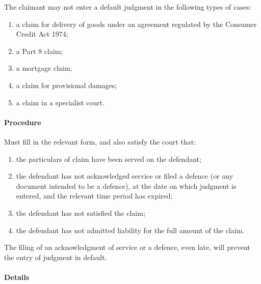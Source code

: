 \documentclass[
]{article}
\newenvironment{Shaded}{}{}
\newcommand{\NormalTok}[1]{#1}
\providecommand{\tightlist}{%
  \setlength{\itemsep}{0pt}\setlength{\parskip}{0pt}}
\begin{document}
The claimant may not enter a default judgment in the following types of
cases:

\begin{enumerate}
\def\labelenumi{\arabic{enumi}.}
\tightlist
\item
  a claim for delivery of goods under an agreement regulated by the
  Consumer Credit Act 1974;
\item
  a Part 8 claim;
\item
  a mortgage claim;
\item
  a claim for provisional damages;
\item
  a claim in a specialist court.
\end{enumerate}

\hypertarget{procedure}{%
\paragraph{Procedure}\label{procedure}}

Must fill in the relevant form, and also satisfy the court that:

\begin{enumerate}
\def\labelenumi{\arabic{enumi}.}
\tightlist
\item
  the particulars of claim have been served on the defendant;
\item
  the defendant has not acknowledged service or filed a defence (or any
  document intended to be a defence), at the date on which judgment is
  entered, and the relevant time period has expired;
\item
  the defendant has not satisfied the claim;
\item
  the defendant has not admitted liability for the full amount of the
  claim.
\end{enumerate}

\begin{Shaded}
\begin{Highlighting}[]
\NormalTok{The filing of an acknowledgment of service or a defence, even late, will prevent the entry of}
\NormalTok{judgment in default.}
\end{Highlighting}
\end{Shaded}

\hypertarget{details}{%
\paragraph{Details}\label{details}}
\end{document}
